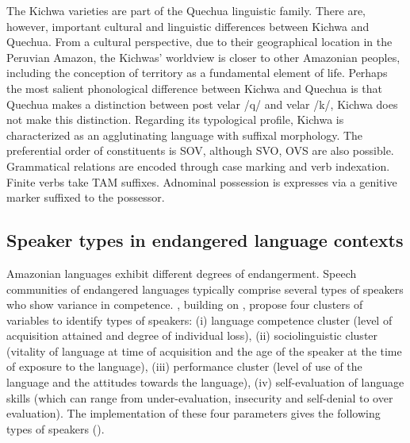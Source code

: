 \documentclass[output=paper]{langscibook}
\begin{document}
The Kichwa varieties are part of the Quechua linguistic family. There are, however, important cultural and linguistic differences between Kichwa and Quechua. From a cultural perspective, due to their geographical location in the Peruvian Amazon, the Kichwas’ worldview is closer to other Amazonian peoples, including the conception of territory as a fundamental element of life. Perhaps the most salient phonological difference between Kichwa and Quechua is that Quechua makes a distinction between post velar /q/ and velar /k/, Kichwa does not make this distinction. Regarding its typological profile, Kichwa is characterized as an agglutinating language with suffixal morphology. The preferential order of constituents is SOV, although SVO, OVS are also possible. Grammatical relations are encoded through case marking and verb indexation. Finite verbs take TAM suffixes. Adnominal possession is expresses via a genitive marker suffixed to the possessor.

\subsection{Speaker types in endangered language contexts}

Amazonian languages exhibit different degrees of endangerment. Speech communities of endangered languages typically comprise several types of speakers who show variance in competence. \citet{GrinevaldBert2011}, building on \citet{Dorian1980}, propose four clusters of variables to identify types of speakers: (i) language competence cluster (level of acquisition attained and degree of individual loss), (ii) sociolinguistic cluster (vitality of language at time of acquisition and the age of the speaker at the time of exposure to the language), (iii) performance cluster (level of use of the language and the attitudes towards the language), (iv) self-evaluation of language skills (which can range from under-evaluation, insecurity and self-denial to over evaluation). The implementation of these four parameters gives the following types of speakers ().
\end{document}
